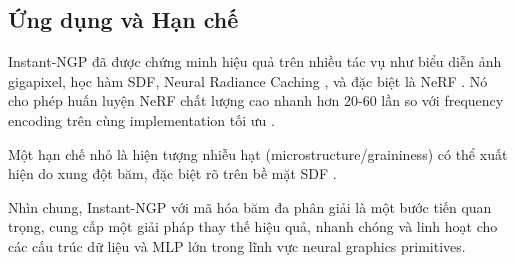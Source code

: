 \subsection{Ứng dụng và Hạn chế}

Instant-NGP đã được chứng minh hiệu quả trên nhiều tác vụ như biểu diễn ảnh gigapixel, học hàm SDF, Neural Radiance Caching \cite{Muller2021NRC}, và đặc biệt là NeRF \cite{Muller2022InstantNGP_source_1}. Nó cho phép huấn luyện NeRF chất lượng cao nhanh hơn 20-60 lần so với frequency encoding trên cùng implementation tối ưu \cite{Muller2022InstantNGP_source_281, Muller2022InstantNGP_source_299}.

Một hạn chế nhỏ là hiện tượng nhiễu hạt (microstructure/graininess) có thể xuất hiện do xung đột băm, đặc biệt rõ trên bề mặt SDF \cite{Muller2022InstantNGP_source_228, Muller2022InstantNGP_source_245, Muller2022InstantNGP_source_328}.

Nhìn chung, Instant-NGP với mã hóa băm đa phân giải là một bước tiến quan trọng, cung cấp một giải pháp thay thế hiệu quả, nhanh chóng và linh hoạt cho các cấu trúc dữ liệu và MLP lớn trong lĩnh vực neural graphics primitives.